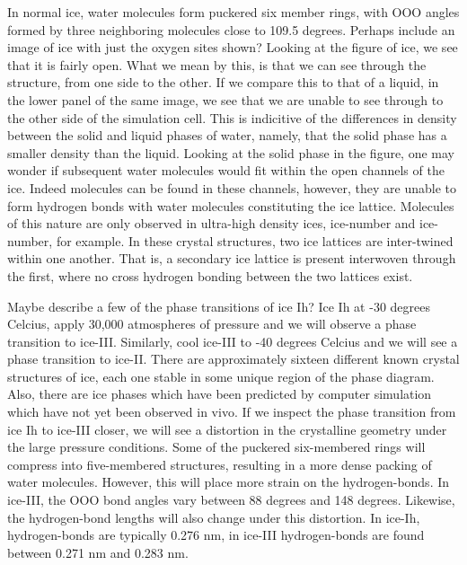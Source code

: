 In normal ice, water molecules form puckered six member rings, with
OOO angles formed by three neighboring molecules close to 109.5
degrees. Perhaps include an image of ice with just the oxygen sites
shown? Looking at the figure of ice, we see that it is fairly
open. What we mean by this, is that we can see through the structure,
from one side to the other. If we compare this to that of a liquid, in
the lower panel of the same image, we see that we are unable to see
through to the other side of the simulation cell. This is indicitive
of the differences in density between the solid and liquid phases of
water, namely, that the solid phase has a smaller density than the
liquid. Looking at the solid phase in the figure, one may wonder if
subsequent water molecules would fit within the open channels of the
ice. Indeed molecules can be found in these channels, however, they
are unable to form hydrogen bonds with water molecules constituting
the ice lattice. Molecules of this nature are only observed in
ultra-high density ices, ice-number and ice-number, for example. In
these crystal structures, two ice lattices are inter-twined within one
another. That is, a secondary ice lattice is present interwoven
through the first, where no cross hydrogen bonding between the two
lattices exist.

Maybe describe a few of the phase transitions of ice Ih? Ice Ih at -30
degrees Celcius, apply 30,000 atmospheres of pressure and we will
observe a phase transition to ice-III. Similarly, cool ice-III to -40
degrees Celcius and we will see a phase transition to ice-II. There
are approximately sixteen different known crystal structures of ice,
each one stable in some unique region of the phase diagram. Also,
there are ice phases which have been predicted by computer simulation
which have not yet been observed in vivo. If we inspect the phase
transition from ice Ih to ice-III closer, we will see a distortion in
the crystalline geometry under the large pressure conditions. Some of
the puckered six-membered rings will compress into five-membered
structures, resulting in a more dense packing of water
molecules. However, this will place more strain on the
hydrogen-bonds. In ice-III, the OOO bond angles vary between 88
degrees and 148 degrees. Likewise, the hydrogen-bond lengths will also
change under this distortion. In ice-Ih, hydrogen-bonds are typically
0.276 nm, in ice-III hydrogen-bonds are found between 0.271 nm and
0.283 nm.

